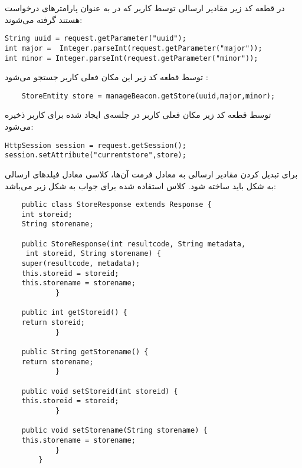 \documentclass[oneside]{report}
\begin{document}
در قطعه کد زیر مقادیر ارسالی توسط کاربر که در به عنوان پارامتر‌های درخواست هستند گرفته می‌شوند:
\begin{latin}
	\begin{verbatim}
String uuid = request.getParameter("uuid");
int major =  Integer.parseInt(request.getParameter("major"));
int minor = Integer.parseInt(request.getParameter("minor"));
	\end{verbatim}
	
\end{latin}
توسط قطعه کد زیر این مکان فعلی کاربر جستجو می‌شود : 
\begin{latin}
	\begin{verbatim}
	StoreEntity store = manageBeacon.getStore(uuid,major,minor);
	\end{verbatim}
	
\end{latin}

توسط قطعه کد زیر مکان فعلی کاربر در جلسه‌ی ایجاد شده برای کاربر ذخیره می‌شود: 
\begin{latin}
	\begin{verbatim}
HttpSession session = request.getSession();
session.setAttribute("currentstore",store);
	\end{verbatim}
	
\end{latin}
برای تبدیل کردن مقادیر ارسالی به معادل فرمت 
{\normalsize{}}
‌آن‌ها، کلاسی معادل فیلد‌های ارسالی به شکل 
{\normalsize{}}
 باید ساخته شود. کلاس استفاده شده برای جواب به شکل زیر می‌باشد: 
\begin{latin}
	\begin{verbatim}
	public class StoreResponse extends Response {
	int storeid;
	String storename;
	
	public StoreResponse(int resultcode, String metadata,
	 int storeid, String storename) {
	super(resultcode, metadata);
	this.storeid = storeid;
	this.storename = storename;
        	}
	
	public int getStoreid() {
	return storeid;
        	}
	
	public String getStorename() {
	return storename;
        	}
	
	public void setStoreid(int storeid) {
	this.storeid = storeid;
        	}
	
	public void setStorename(String storename) {
	this.storename = storename;
         	}
     	}
	
	\end{verbatim}
	
\end{latin}
\end{document}

